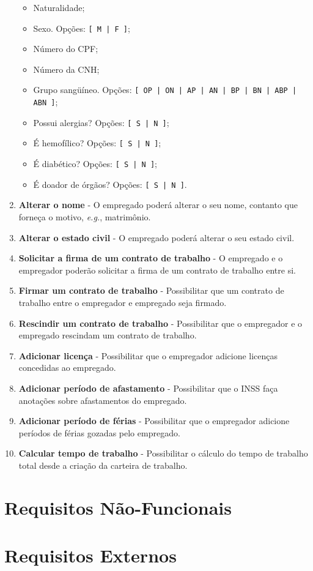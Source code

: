 \documentclass[a4paper,10pt]{article}
\begin{document}
\begin{enumerate}
\begin{itemize}
      \item Naturalidade;
      \item Sexo. Opções: \texttt{[ M | F ]};
      \item Número do CPF;
      \item Número da CNH;
      \item Grupo sangüíneo. Opções: \texttt{[ OP | ON | AP | AN | BP | BN | ABP | ABN ]};
      \item Possui alergias? Opções: \texttt{[ S | N ]};
      \item É hemofílico? Opções: \texttt{[ S | N ]};
      \item É diabético? Opções: \texttt{[ S | N ]};
      \item É doador de órgãos? Opções: \texttt{[ S | N ]}.
    \end{itemize}
  \item \textbf{Alterar o nome} - O empregado poderá alterar o seu nome, contanto que forneça o motivo, \emph{e.g.}, matrimônio.
  \item \textbf{Alterar o estado civil} - O empregado poderá alterar o seu estado civil.
  \item \textbf{Solicitar a firma de um contrato de trabalho} - O empregado e o empregador poderão solicitar a firma de um contrato de trabalho entre si.
  \item \textbf{Firmar um contrato de trabalho} - Possibilitar que um contrato de trabalho entre o empregador e empregado seja firmado.
  \item \textbf{Rescindir um contrato de trabalho} - Possibilitar que o empregador e o empregado rescindam um contrato de trabalho.
  \item \textbf{Adicionar licença} - Possibilitar que o empregador adicione licenças concedidas ao empregado. 
  \item \textbf{Adicionar período de afastamento} - Possibilitar que o INSS faça anotações sobre afastamentos do empregado.
  \item \textbf{Adicionar período de férias} - Possibilitar que o empregador adicione períodos de férias gozadas pelo empregado.
  \item \textbf{Calcular tempo de trabalho} - Possibilitar o cálculo do tempo de trabalho total desde a criação da carteira de trabalho.
\end{enumerate}

\section{Requisitos Não-Funcionais}
\section{Requisitos Externos}
\end{document}
